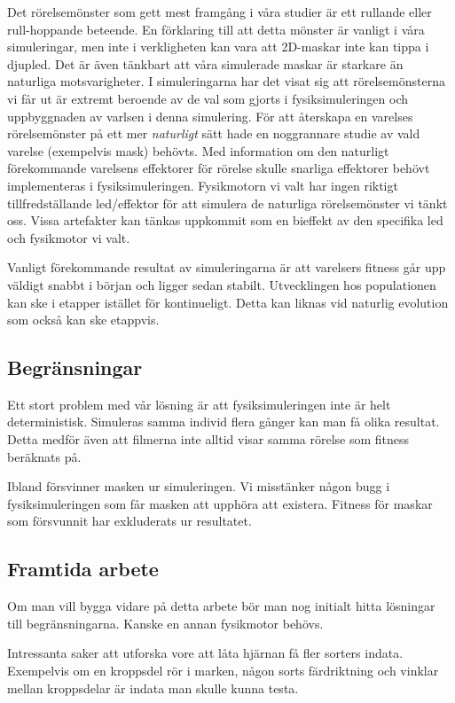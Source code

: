 \documentclass[titlepage, twocolumn, a4paper, 11pt, swedish]{article}
\begin{document}
Det rörelsemönster som gett mest framgång i våra studier är ett rullande eller rull-hoppande beteende. En förklaring till att detta mönster är vanligt i våra simuleringar, men inte i verkligheten kan vara att 2D-maskar inte kan tippa i djupled. Det är även tänkbart att våra simulerade maskar är starkare än naturliga motsvarigheter. I simuleringarna har det visat sig att rörelsemönsterna vi får ut är extremt beroende av de val som gjorts i fysiksimuleringen och uppbyggnaden av varlsen i denna simulering. För att återskapa en varelses rörelsemönster på ett mer \textit{naturligt} sätt hade en noggrannare studie av vald varelse (exempelvis mask) behövts. Med information om den naturligt förekommande varelsens effektorer för rörelse skulle snarliga effektorer behövt implementeras i fysiksimuleringen. Fysikmotorn vi valt har ingen riktigt tillfredställande led/effektor för att simulera de naturliga rörelsemönster vi tänkt oss. Vissa artefakter kan tänkas uppkommit som en bieffekt av den specifika led och fysikmotor vi valt.

Vanligt förekommande resultat av simuleringarna är att varelsers fitness går upp väldigt snabbt i början och ligger sedan stabilt. Utvecklingen hos populationen kan ske i etapper istället för kontinueligt. Detta kan liknas vid naturlig evolution som också kan ske etappvis.

\subsection{Begränsningar}
Ett stort problem med vår lösning är att fysiksimuleringen inte är helt deterministisk. Simuleras samma individ flera gånger kan man få olika resultat. Detta medför även att filmerna inte alltid visar samma rörelse som fitness beräknats på.

Ibland försvinner masken ur simuleringen. Vi misstänker någon bugg i fysiksimuleringen som får masken att upphöra att existera. Fitness för maskar som försvunnit har exkluderats ur resultatet. 

\subsection{Framtida arbete}
Om man vill bygga vidare på detta arbete bör man nog initialt hitta lösningar till begränsningarna. Kanske en annan fysikmotor behövs. 

Intressanta saker att utforska vore att låta hjärnan få fler sorters indata. Exempelvis om en kroppsdel rör i marken, någon sorts färdriktning och vinklar mellan kroppsdelar är indata man skulle kunna testa.
\end{document}
